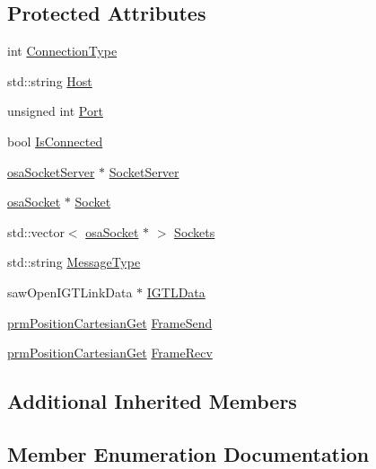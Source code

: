 \subsection*{Protected Attributes}
\begin{DoxyCompactItemize}
\item 
int \hyperlink{classmts_open_i_g_t_link_a62845fdde2c3186db262a28c1ef7ee85}{Connection\+Type}
\item 
std\+::string \hyperlink{classmts_open_i_g_t_link_aa416769aea8ba2074b1fa352c150facb}{Host}
\item 
unsigned int \hyperlink{classmts_open_i_g_t_link_a2e29caf8f3e7452f26f6908d17386ee1}{Port}
\item 
bool \hyperlink{classmts_open_i_g_t_link_abd2384165d5e4045215e695975780eef}{Is\+Connected}
\item 
\hyperlink{classosa_socket_server}{osa\+Socket\+Server} $\ast$ \hyperlink{classmts_open_i_g_t_link_adc1f9d5e4dbc18d71552a41d17940893}{Socket\+Server}
\item 
\hyperlink{classosa_socket}{osa\+Socket} $\ast$ \hyperlink{classmts_open_i_g_t_link_a92517a30507bb0c5f2717084bf6fcd01}{Socket}
\item 
std\+::vector$<$ \hyperlink{classosa_socket}{osa\+Socket} $\ast$ $>$ \hyperlink{classmts_open_i_g_t_link_ac8e7ec9abbd6cb65bbe6a45dd3c4ed80}{Sockets}
\item 
std\+::string \hyperlink{classmts_open_i_g_t_link_a093697b394242318dc24586d22b9a7d1}{Message\+Type}
\item 
saw\+Open\+I\+G\+T\+Link\+Data $\ast$ \hyperlink{classmts_open_i_g_t_link_a6ea66218c525d89e6ca0a5234d252078}{I\+G\+T\+L\+Data}
\item 
\hyperlink{classprm_position_cartesian_get}{prm\+Position\+Cartesian\+Get} \hyperlink{classmts_open_i_g_t_link_a97da17fac3c8d91dcd09005f06ded93a}{Frame\+Send}
\item 
\hyperlink{classprm_position_cartesian_get}{prm\+Position\+Cartesian\+Get} \hyperlink{classmts_open_i_g_t_link_aac470cfdb42709fbdb6d9228991204e2}{Frame\+Recv}
\end{DoxyCompactItemize}
\subsection*{Additional Inherited Members}


\subsection{Member Enumeration Documentation}
\hypertarget{classmts_open_i_g_t_link_aa7353a6a3f98f611defbaf89f13c8a27}{}
